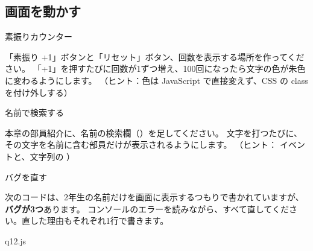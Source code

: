 \subsection*{画面を動かす}

\begin{exercise}[2]{素振りカウンター}
\toanswer\par
「素振り +1」ボタンと「リセット」ボタン、回数を表示する場所を作ってください。
「+1」を押すたびに回数が1ずつ増え、100回になったら文字の色が朱色に変わるようにします。
（ヒント：色は JavaScript で直接変えず、CSS の class を付け外しする）
\end{exercise}

\begin{exercise}[3]{名前で検索する}
\toanswer\par
本章の部員紹介に、名前の検索欄（）を足してください。
文字を打つたびに、その文字を名前に含む部員だけが表示されるようにします。
（ヒント： イベントと、文字列の ）
\end{exercise}

\begin{exercise}[3]{バグを直す}
\toanswer\par
次のコードは、2年生の名前だけを画面に表示するつもりで書かれていますが、\textbf{バグが3つ}あります。
コンソールのエラーを読みながら、すべて直してください。直した理由もそれぞれ1行で書きます。
\begin{filebox}{q12.js}
\end{filebox}
\end{exercise}
